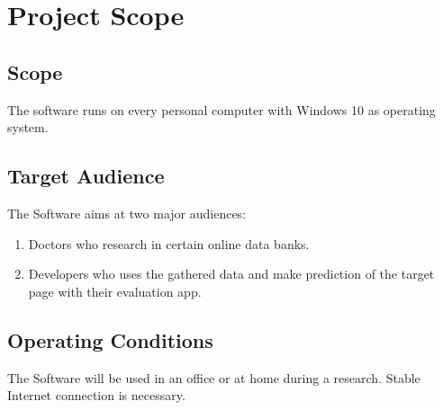 \chapter{Project Scope}
\label{ch:scope}

\section{Scope}
The software runs on every personal computer with Windows 10 as operating system.
\section{Target Audience}
The Software aims at two major audiences:
\begin{enumerate}
    \item Doctors who research in certain online data banks.%
    \item Developers who uses the gathered data and make prediction of the target page with their evaluation app.%
\end{enumerate}
\section{Operating Conditions}
The Software will be used in an office or at home during a research. Stable Internet connection is necessary.

